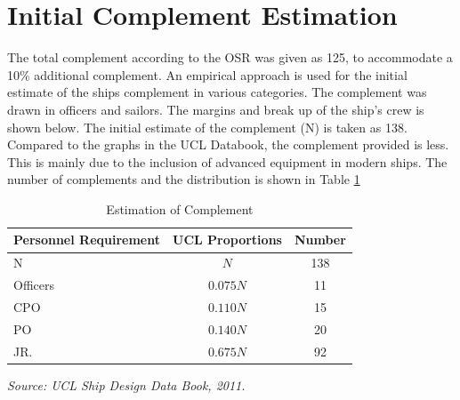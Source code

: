 \documentclass[12pt,a4paper,twoside]{report}
\begin{document}
   \section{Initial Complement Estimation}The total complement according to the OSR was given as 125, to accommodate a 10\% additional complement. An empirical approach is used for the initial estimate of the ships complement in various categories. The complement was drawn in officers and sailors. The margins and break up of the ship's crew is shown below. The initial estimate of the complement (N) is taken as 138. Compared to the graphs in the UCL Databook, the complement provided is less. This is mainly due to the inclusion of advanced equipment in modern ships. The number of complements and the distribution is shown in Table \ref{tab:complement}
\begin{table}[htbp]
\centering
\caption{Estimation of Complement}
\label{tab:complement}

\begin{tabular}{lcc}
\toprule
\textbf{Personnel Requirement} & \textbf{UCL Proportions} & \textbf{Number} \\
\midrule
N         & $N$       & 138 \\
Officers  & $0.075N$  & 11  \\
CPO       & $0.110N$  & 15  \\
PO        & $0.140N$  & 20  \\
JR.       & $0.675N$  & 92  \\
\bottomrule
\end{tabular}

\vspace{2mm}

\footnotesize
\textit{Source: UCL Ship Design Data Book, 2011. \cite{ucl_ship_design_data_book}}

\end{table}
\end{document}

